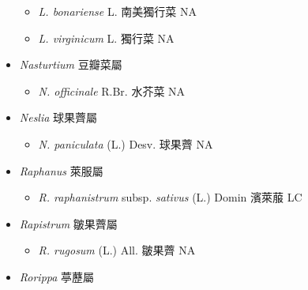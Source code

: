 \begin{itemize}
  \begin{itemize}
        \item[] \textit{L. bonariense} L.  南美獨行菜   NA
        \item[] \textit{L. virginicum} L.  獨行菜   NA
  \end{itemize}
 \item[] \textit{Nasturtium} 豆瓣菜屬
                                
  \begin{itemize}
        \item[] \textit{N. officinale} R.Br.  水芥菜   NA
  \end{itemize}
 \item[] \textit{Neslia} 球果薺屬
                                
  \begin{itemize}
        \item[] \textit{N. paniculata} (L.) Desv.  球果薺   NA
  \end{itemize}
 \item[] \textit{Raphanus} 萊服屬
                                
  \begin{itemize}
        \item[] \textit{R. raphanistrum} subsp. \textit{sativus} (L.) Domin  濱萊菔   LC
  \end{itemize}
 \item[] \textit{Rapistrum} 皺果薺屬
                                
  \begin{itemize}
        \item[] \textit{R. rugosum} (L.) All.  皺果薺   NA
  \end{itemize}
 \item[] \textit{Rorippa} 葶藶屬
                                

\end{itemize}
